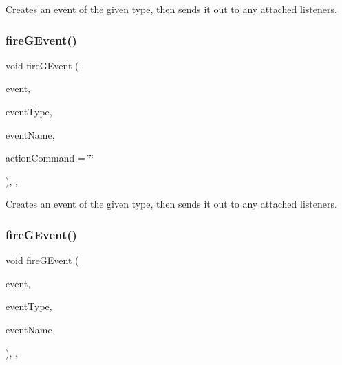 Creates an event of the given type, then sends it out to any attached listeners. 

\mbox{\label{classsgl_1_1GObservable_a119318675d2165bdf7dd853aaf881d4b}} 
\subsubsection{\texorpdfstring{fire\+G\+Event()}{fireGEvent()}\hspace{0.1cm}{\footnotesize\ttfamily [4/8]}}
{\footnotesize\ttfamily void fire\+G\+Event (\begin{DoxyParamCaption}\item[{Q\+Mouse\+Event $\ast$}]{event,  }\item[{\mbox{\hyperlink{namespacesgl_a2628ea8d12e8b2563c32f05dc7fff6fa}{Event\+Type}}}]{event\+Type,  }\item[{const std\+::string \&}]{event\+Name,  }\item[{const std\+::string \&}]{action\+Command = {\ttfamily \char`\"{}\char`\"{}} }\end{DoxyParamCaption})\hspace{0.3cm}{\ttfamily [protected]}, {\ttfamily [virtual]}, {\ttfamily [inherited]}}



Creates an event of the given type, then sends it out to any attached listeners. 

\mbox{\label{classsgl_1_1GObservable_a63fd9034e1e1633c1c38eb342bfd34e9}} 
\subsubsection{\texorpdfstring{fire\+G\+Event()}{fireGEvent()}\hspace{0.1cm}{\footnotesize\ttfamily [5/8]}}
{\footnotesize\ttfamily void fire\+G\+Event (\begin{DoxyParamCaption}\item[{Q\+Resize\+Event $\ast$}]{event,  }\item[{\mbox{\hyperlink{namespacesgl_a2628ea8d12e8b2563c32f05dc7fff6fa}{Event\+Type}}}]{event\+Type,  }\item[{const std\+::string \&}]{event\+Name }\end{DoxyParamCaption})\hspace{0.3cm}{\ttfamily [protected]}, {\ttfamily [virtual]}, {\ttfamily [inherited]}}



